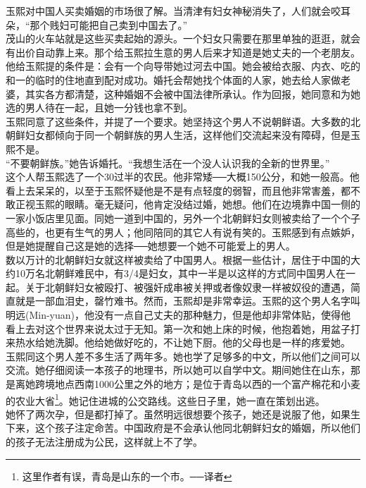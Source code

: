 玉熙对中国人买卖婚姻的市场很了解。当清津有妇女神秘消失了，人们就会咬耳朵，“那个贱妇可能把自己卖到中国去了。”\\

茂山的火车站就是这些买卖起始的源头。一个妇女只需要在那里单独的逛逛，就会有出价自动靠上来。那个给玉熙拉生意的男人后来才知道是她丈夫的一个老朋友。他给玉熙提的条件是：会有一个向导带她过河去中国。她会被给衣服、内衣、吃的和一的临时的住地直到配对成功。婚托会帮她找个体面的人家，她去给人家做老婆，其实各方都清楚，这种婚姻不会被中国法律所承认。作为回报，她同意和为她选的男人待在一起，且她一分钱也拿不到。\\

玉熙同意了这些条件，并提了一个要求。她坚持这个男人不说朝鲜语。大多数的北朝鲜妇女都倾向于同一个朝鲜族的男人生活，这样他们交流起来没有障碍，但是玉熙不是。\\

“不要朝鲜族。”她告诉婚托。“我想生活在一个没人认识我的全新的世界里。”\\

这个人帮玉熙选了一个30过半的农民。他非常矮──大概150公分，和她一般高。他看上去呆呆的，以至于玉熙怀疑他是不是有点轻度的弱智，而且他非常害羞，都不敢正视玉熙的眼睛。毫无疑问，他肯定没结过婚，她想。他们在边境靠中国一侧的一家小饭店里见面。同她一道到中国的，另外一个北朝鲜妇女则被卖给了一个个子高些的，也更有生气的男人；他同陪同的其它人有说有笑的。玉熙感到有点嫉妒，但是她提醒自己这是她的选择──她想要一个她不可能爱上的男人。\\

数以万计的北朝鲜妇女就这样被卖给了中国男人。根据一些估计，居住于中国的大约10万名北朝鲜难民中，有3/4是妇女，其中一半是以这样的方式同中国男人在一起。关于北朝鲜妇女被殴打、被强奸成串被关押或者像奴隶一样被奴役的遭遇，简直就是一部血泪史，罄竹难书。然而，玉熙却是非常幸运。玉熙的这个男人名字叫明远(Min-yuan)，他没有一点自己丈夫的那种魅力，但是他却非常体贴，使得他看上去对这个世界来说太过于无知。第一次和她上床的时候，他抱着她，用盆子打来热水给她洗脚。他给她做好吃的，不让她下厨。他的父母也是一样的疼爱她。\\

玉熙同这个男人差不多生活了两年多。她也学了足够多的中文，所以他们之间可以交流。她仔细阅读一本孩子的地理书，所以她可以自学中文。期间她住在山东，那是离她跨境地点西南1000公里之外的地方；是位于青岛以西的一个富产棉花和小麦的农业大省\footnote{这里作者有误，青岛是山东的一个市。──译者}。她记住进城的公交路线。这些日子里，她一直在策划出逃。\\

她怀了两次孕，但是都打掉了。虽然明远很想要个孩子，她还是说服了他，如果生下来，这个孩子注定命苦。中国政府是不会承认他同北朝鲜妇女的婚姻，所以他们的孩子无法注册成为公民，这样就上不了学。\\

